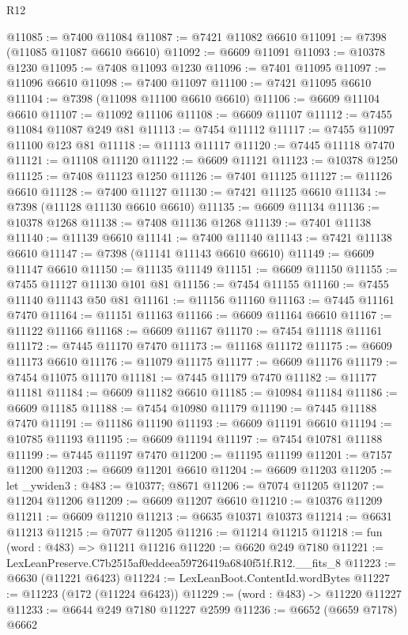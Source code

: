 \begin{lexlean}{R12}
\begin{coremodule}
@11085 := @7400 @11084
@11087 := @7421 @11082 @6610
@11091 := @7398 (@11085 @11087 @6610 @6610)
@11092 := @6609 @11091
@11093 := @10378 @1230
@11095 := @7408 @11093 @1230
@11096 := @7401 @11095
@11097 := @11096 @6610
@11098 := @7400 @11097
@11100 := @7421 @11095 @6610
@11104 := @7398 (@11098 @11100 @6610 @6610)
@11106 := @6609 @11104 @6610
@11107 := @11092 @11106
@11108 := @6609 @11107
@11112 := @7455 @11084 @11087 @249 @81
@11113 := @7454 @11112
@11117 := @7455 @11097 @11100 @123 @81
@11118 := @11113 @11117
@11120 := @7445 @11118 @7470
@11121 := @11108 @11120
@11122 := @6609 @11121
@11123 := @10378 @1250
@11125 := @7408 @11123 @1250
@11126 := @7401 @11125
@11127 := @11126 @6610
@11128 := @7400 @11127
@11130 := @7421 @11125 @6610
@11134 := @7398 (@11128 @11130 @6610 @6610)
@11135 := @6609 @11134
@11136 := @10378 @1268
@11138 := @7408 @11136 @1268
@11139 := @7401 @11138
@11140 := @11139 @6610
@11141 := @7400 @11140
@11143 := @7421 @11138 @6610
@11147 := @7398 (@11141 @11143 @6610 @6610)
@11149 := @6609 @11147 @6610
@11150 := @11135 @11149
@11151 := @6609 @11150
@11155 := @7455 @11127 @11130 @101 @81
@11156 := @7454 @11155
@11160 := @7455 @11140 @11143 @50 @81
@11161 := @11156 @11160
@11163 := @7445 @11161 @7470
@11164 := @11151 @11163
@11166 := @6609 @11164 @6610
@11167 := @11122 @11166
@11168 := @6609 @11167
@11170 := @7454 @11118 @11161
@11172 := @7445 @11170 @7470
@11173 := @11168 @11172
@11175 := @6609 @11173 @6610
@11176 := @11079 @11175
@11177 := @6609 @11176
@11179 := @7454 @11075 @11170
@11181 := @7445 @11179 @7470
@11182 := @11177 @11181
@11184 := @6609 @11182 @6610
@11185 := @10984 @11184
@11186 := @6609 @11185
@11188 := @7454 @10980 @11179
@11190 := @7445 @11188 @7470
@11191 := @11186 @11190
@11193 := @6609 @11191 @6610
@11194 := @10785 @11193
@11195 := @6609 @11194
@11197 := @7454 @10781 @11188
@11199 := @7445 @11197 @7470
@11200 := @11195 @11199
@11201 := @7157 @11200
@11203 := @6609 @11201 @6610
@11204 := @6609 @11203
@11205 := let _ywiden3 : @483 := @10377; @8671
@11206 := @7074 @11205
@11207 := @11204 @11206
@11209 := @6609 @11207 @6610
@11210 := @10376 @11209
@11211 := @6609 @11210
@11213 := @6635 @10371 @10373
@11214 := @6631 @11213
@11215 := @7077 @11205
@11216 := @11214 @11215
@11218 := fun (word : @483) => @11211 @11216
@11220 := @6620 @249 @7180
@11221 := LexLeanPreserve.C7b2515af0eddeea59726419a6840f51f.R12.__fits_8
@11223 := @6630 (@11221 @6423)
@11224 := LexLeanBoot.ContentId.wordBytes
@11227 := @11223 (@172 (@11224 @6423))
@11229 := (word : @483) -> @11220 @11227
@11233 := @6644 @249 @7180 @11227 @2599
@11236 := @6652 (@6659 @7178) @6662

\end{coremodule}
\end{lexlean}

